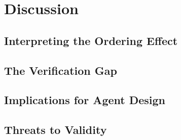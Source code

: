 \chapter{Discussion}
\label{ch:discussion}

\section{Interpreting the Ordering Effect}
\label{sec:disc-ordering}

\section{The Verification Gap}
\label{sec:disc-verification}

\section{Implications for Agent Design}
\label{sec:disc-design}

\section{Threats to Validity}
\label{sec:disc-threats}
